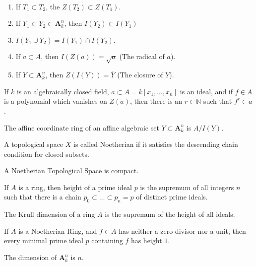 \documentclass[crop=false,class=book,oneside]{standalone}
\begin{document}
\begin{theorem}
\
\begin{enumerate}
    \item If $T_1\subset T_2$, the  $Z(T_2)\subset Z(T_1)$.
    \item If $Y_1\subset Y_2 \subset \textbf{A}_k^n$, then $I(Y_2)\subset I(Y_1)$
    \item $I(Y_1\cup Y_2) = I(Y_1)\cap I(Y_2)$.
    \item If $a\subset A$, then $I(Z(a)) = \sqrt{a}$ (The radical of $a$).
    \item If $Y\subset \textbf{A}_k^n$, then $Z(I(Y)) = \overline{Y}$ (The closure of $Y$).
\end{enumerate}
\end{theorem}
\begin{theorem}
If $k$ is an algebraically closed field, $a\subset A=k[x_1,\hdots ,x_n]$ is an ideal, and if $f\in A$ is a polynomial which vanishes on $Z(a)$, then there is an $r\in \mathbb{N}$ such that $f^{r}\in a$.
\end{theorem}
\begin{definition}
The affine coordinate ring of an affine algebraic set $Y\subset \textbf{A}_k^n$ is $A/I(Y)$.
\end{definition}
\begin{definition}
A topological space $X$ is called Noetherian if it satisfies the descending chain condition for closed subsets.
\end{definition}
\begin{theorem}
A Noetherian Topological Space is compact.
\end{theorem}
\begin{definition}
If $A$ is a ring, then height of a prime ideal $p$ is the supremum of all integers $n$ such that there is a chain $p_0\subset \hdots \subset p_n = p$ of distinct prime ideals.
\end{definition}
\begin{definition}
The Krull dimension of a ring $A$ is the supremum of the height of all ideals.
\end{definition}
\begin{theorem}
If $A$ is a Noetherian Ring, and $f\in A$ has neither a zero divisor nor a unit, then every minimal prime ideal $p$ containing $f$ has height $1$.
\end{theorem}
\begin{theorem}
The dimension of $\textbf{A}_k^n$ is $n$.
\end{theorem}
\end{document}
